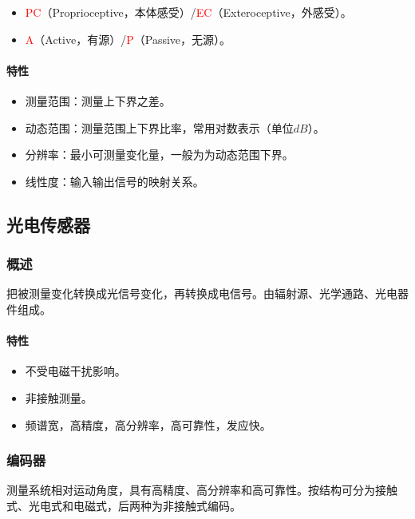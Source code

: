 \documentclass[
12pt, %
a4paper, 
oneside, %
]{scrartcl}
\begin{document}
\begin{itemize}
\item \textcolor{red}{PC}（Proprioceptive，本体感受）/\textcolor{red}{EC}（Exteroceptive，外感受）。
\item \textcolor{red}{A}（Active，有源）/\textcolor{red}{P}（Passive，无源）。
\end{itemize}
\paragraph{特性}
\begin{itemize}
\item 测量范围：测量上下界之差。    
\item 动态范围：测量范围上下界比率，常用对数表示（单位$ dB $）。
\item 分辨率：最小可测量变化量，一般为为动态范围下界。
\item 线性度：输入输出信号的映射关系。
\end{itemize}
\subsection[光电传感器]{光电传感器}
\subsubsection[概述]{概述}
把被测量变化转换成光信号变化，再转换成电信号。由辐射源、光学通路、光电器件组成。
\paragraph{特性}
\begin{itemize}
\item 不受电磁干扰影响。
\item 非接触测量。
\item 频谱宽，高精度，高分辨率，高可靠性，发应快。
\end{itemize}
\subsubsection[编码器]{编码器}
测量系统相对运动角度，具有高精度、高分辨率和高可靠性。按结构可分为接触式、光电式和电磁式，后两种为非接触式编码。
\end{document}

